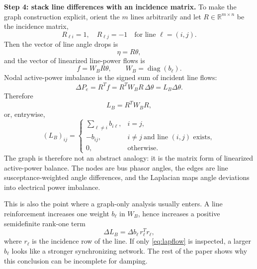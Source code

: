 \documentclass[conference]{IEEEtran}
\begin{document}
\noindent\textbf{Step 4: stack line differences with an incidence matrix.}
To make the graph construction explicit, orient the $m$ lines arbitrarily and
let $R\in\mathbb{R}^{m\times n}$ be the incidence matrix,
\begin{equation}
  R_{\ell i}=1,\quad R_{\ell j}=-1
  \quad\text{for line }\ell=(i,j).
  \label{eq:incidence}
\end{equation}
Then the vector of line angle drops is
\begin{equation}
  \eta = R\theta,
  \label{eq:edgegradient}
\end{equation}
and the vector of linearized line-power flows is
\begin{equation}
  f = W_B R\theta,
  \qquad
  W_B=\operatorname{diag}(b_\ell).
  \label{eq:edgeflow}
\end{equation}
Nodal active-power imbalance is the signed sum of incident line flows:
\begin{equation}
  \Delta P_e=R^T f
  =R^TW_BR\,\Delta\theta
  =L_B\Delta\theta.
  \label{eq:lapflow}
\end{equation}
Therefore
\begin{equation}
  L_B=R^TW_BR,
  \label{eq:lapincidence}
\end{equation}
or, entrywise,
\begin{equation}
  (L_B)_{ij}=
  \begin{cases}
    \sum_{\ell\neq i}b_{i\ell}, & i=j,\\
    -b_{ij}, & i\neq j\ \text{and line }(i,j)\text{ exists},\\
    0, & \text{otherwise}.
  \end{cases}
  \label{eq:lapentries}
\end{equation}
The graph is therefore not an abstract analogy: it is the matrix form of
linearized active-power balance. The nodes are bus phasor angles, the edges are
line susceptance-weighted angle differences, and the Laplacian maps angle
deviations into electrical power imbalance.

This is also the point where a graph-only analysis usually enters. A line
reinforcement increases one weight $b_\ell$ in $W_B$, hence increases a positive
semidefinite rank-one term
\begin{equation}
  \Delta L_B = \Delta b_\ell\, r_\ell^T r_\ell,
  \label{eq:line_rankone}
\end{equation}
where $r_\ell$ is the incidence row of the line. If only \eqref{eq:lapflow} is
inspected, a larger $b_\ell$ looks like a stronger synchronizing network. The
rest of the paper shows why this conclusion can be incomplete for damping.
\end{document}
